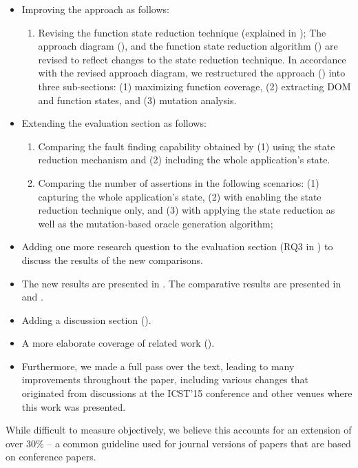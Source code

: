 \begin{itemize}

\item Improving the approach as follows:

\begin{enumerate}
\item Revising the function state reduction technique (explained in ); The approach diagram (), and the function state reduction algorithm () are revised to reflect changes to the state reduction technique. In accordance with the revised approach diagram, we restructured the approach () into three sub-sections: (1) maximizing function coverage, (2) extracting DOM and \javascript function states, and (3) mutation analysis.
\end{enumerate}

\item Extending the evaluation section as follows:

\begin{enumerate} 
\item Comparing the fault finding capability obtained by (1) using the state reduction mechanism and (2) including the whole application's state.
\item Comparing the number of assertions in the following scenarios:
(1) capturing the whole application's state, (2) with enabling the state reduction technique only, and (3) with applying the state reduction as well as the mutation-based oracle generation algorithm;
\end{enumerate}

\item Adding one more research question to the evaluation section (RQ3 in ) to discuss the results of the new comparisons. 

\item The new results are presented in . The comparative results are presented in  and .
\item Adding a discussion section (). 
\item A more elaborate coverage of related work ().
\item Furthermore, we made a full pass over the text,
   leading to many improvements throughout the paper,
   including various changes that originated from discussions at the
   ICST'15 conference and other venues where this work was presented. 

\end{itemize}

\medskip

While difficult to measure objectively, we believe this accounts for
   an extension of over 30\% -- a common guideline used for journal versions
   of papers that are based on conference papers.
